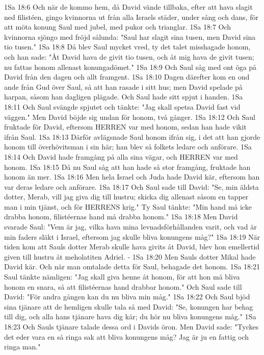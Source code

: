 1Sa 18:6  Och när de kommo hem, då David vände tillbaka, efter att hava slagit ned filistéen, gingo kvinnorna ut från alla Israels städer, under sång och dans, för att möta konung Saul med jubel, med pukor och trianglar.
1Sa 18:7  Och kvinnorna sjöngo med fröjd sålunda: "Saul har slagit sina tusen, men David sina tio tusen."
1Sa 18:8  Då blev Saul mycket vred, ty det talet misshagade honom, och han sade: "Åt David hava de givit tio tusen, och åt mig hava de givit tusen; nu fattas honom allenast konungadömet."
1Sa 18:9  Och Saul såg med ont öga på David från den dagen och allt framgent.
1Sa 18:10  Dagen därefter kom en ond ande från Gud över Saul, så att han rasade i sitt hus; men David spelade på harpan, såsom han dagligen plägade. Och Saul hade sitt spjut i handen.
1Sa 18:11  Och Saul svängde spjutet och tänkte: "Jag skall spetsa David fast vid väggen." Men David böjde sig undan för honom, två gånger.
1Sa 18:12  Och Saul fruktade för David, eftersom HERREN var med honom, sedan han hade vikit ifrån Saul.
1Sa 18:13  Därför avlägsnade Saul honom ifrån sig, i det att han gjorde honom till överhövitsman i sin här; han blev så folkets ledare och anförare.
1Sa 18:14  Och David hade framgång på alla sina vägar, och HERREN var med honom.
1Sa 18:15  Då nu Saul såg att han hade så stor framgång, fruktade han honom än mer.
1Sa 18:16  Men hela Israel och Juda hade David kär, eftersom han var deras ledare och anförare.
1Sa 18:17  Och Saul sade till David: "Se, min äldsta dotter, Merab, vill jag giva dig till hustru; skicka dig allenast såsom en tapper man i min tjänst, och för HERRENS krig." Ty Saul tänkte: "Min hand må icke drabba honom, filistéernas hand må drabba honom."
1Sa 18:18  Men David svarade Saul: "Vem är jag, vilka hava mina levnadsförhållanden varit, och vad är min faders släkt i Israel, eftersom jag skulle bliva konungens måg?"
1Sa 18:19  När tiden kom att Sauls dotter Merab skulle hava givits åt David, blev hon emellertid given till hustru åt meholatiten Adriel. -
1Sa 18:20  Men Sauls dotter Mikal hade David kär. Och när man omtalade detta för Saul, behagade det honom.
1Sa 18:21  Saul tänkte nämligen: "Jag skall giva henne åt honom, för att hon må bliva honom en snara, så att filistéernas hand drabbar honom." Och Saul sade till David: "För andra gången kan du nu bliva min måg."
1Sa 18:22  Och Saul bjöd sina tjänare att de hemligen skulle tala så med David: "Se, konungen har behag till dig, och alla hans tjänare hava dig kär; du hör nu bliva konungens måg."
1Sa 18:23  Och Sauls tjänare talade dessa ord i Davids öron. Men David sade: "Tyckes det eder vara en så ringa sak att bliva konungens måg? Jag är ju en fattig och ringa man."
